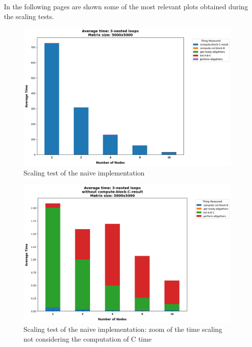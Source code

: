 \documentclass{article}
\begin{document}
    In the following pages are shown some of the most relevant plots obtained during the scaling tests.
    \newpage

    \begin{figure}
        \includegraphics[width=\textwidth]{plots/00-3_nested_loops}
        \caption{Scaling test of the naive implementation}
    \end{figure}

    \begin{figure}
        \includegraphics[width=\textwidth]{plots/01-3_nested_loop_no_compute_C_res}
        \caption{Scaling test of the naive implementation: zoom of the time scaling not considering the computation of C time}
    \end{figure}
\end{document}
